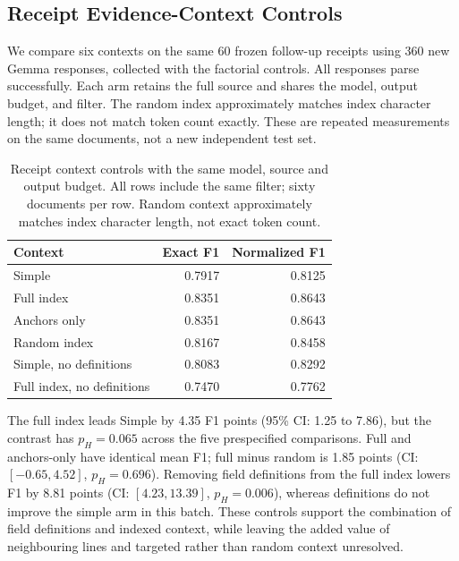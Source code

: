 \subsection{Receipt Evidence-Context Controls}
\label{sec:eval:recovery_ablation}
We compare six contexts on the same 60 frozen follow-up receipts using 360
new Gemma responses, collected with the factorial controls. All responses
parse successfully. Each arm retains the full source and shares the model,
output budget, and filter. The random index approximately matches index
character length; it does not match token count exactly. These are repeated
measurements on the same documents, not a new independent test set.

\begin{table}[t]

\centering

\caption{Receipt context controls with the same model, source and output budget. All rows include the same filter; sixty documents per row. Random context approximately matches index character length, not exact token count.}

\label{tab:recovery_index}

\small

\begin{tabular}{lrr}

\toprule

Context & Exact F1 & Normalized F1 \\

\midrule

Simple & 0.7917 & 0.8125 \\

Full index & 0.8351 & 0.8643 \\

Anchors only & 0.8351 & 0.8643 \\

Random index & 0.8167 & 0.8458 \\

Simple, no definitions & 0.8083 & 0.8292 \\

Full index, no definitions & 0.7470 & 0.7762 \\

\bottomrule

\end{tabular}

\end{table}

The full index leads Simple by 4.35 F1 points (95\% CI: 1.25 to 7.86), but the contrast has $p_H=0.065$ across the five prespecified comparisons. Full and anchors-only have identical mean F1; full minus random is 1.85 points (CI: $[-0.65,4.52]$, $p_H=0.696$). Removing field definitions from the full index lowers F1 by 8.81 points (CI: $[4.23,13.39]$, $p_H=0.006$), whereas definitions do not improve the simple arm in this batch. These controls support the combination of field definitions and indexed context, while leaving the added value of neighbouring lines and targeted rather than random context unresolved.

